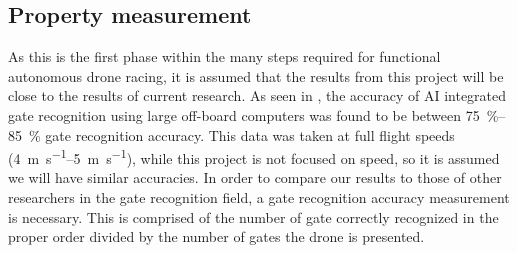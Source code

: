 \documentclass[onecolumn,10pt]{IEEEtran}
\begin{document}
\subsection{Property measurement}

As this is the first phase within the many steps required for functional autonomous drone racing, it is assumed that the results from this project will be close to the results of current research. As seen in \cite{jung2018perception}, the accuracy of AI integrated gate recognition using large off-board computers was found to be between \SIrange{75}{85}{\percent} gate recognition accuracy. This data was taken at full flight speeds (\SIrange{4}{5}{\meter\per\second}), while this project is not focused on speed, so it is assumed we will have similar accuracies. In order to compare our results to those of other researchers in the gate recognition field, a gate recognition accuracy measurement is necessary. This is comprised of the number of gate correctly recognized in the proper order divided by the number of gates the drone is presented.
\end{document}
